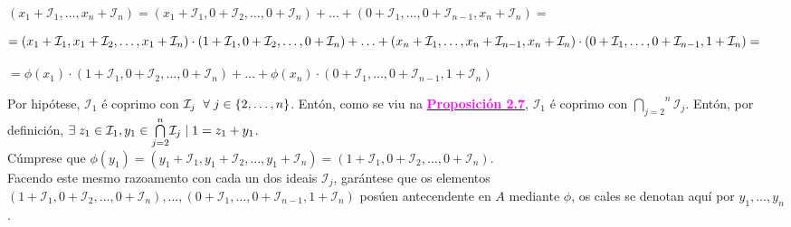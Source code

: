 \documentclass[twoside]{report}
\newcommand{\magbf}[1]{\textcolor{magenta}{\textbf{#1}}} %
\theoremstyle{mystyle}
\begin{document}
\begin{center}
$(x_{1} + \mathcal{I}_{1}, \ldots, x_{n} + \mathcal{I}_{n}) = (x_{1} + \mathcal{I}_{1}, 0 + \mathcal{I}_{2}, \ldots, 0 + \mathcal{I}_{n}) + \ldots + (0 + \mathcal{I}_{1}, \ldots, 0 + \mathcal{I}_{n-1}, x_{n} + \mathcal{I}_{n}) = $ 
\end{center}
$$\hspace{-7mm} = (x_{1} + \mathcal{I}_{1}, x_{1} + \mathcal{I}_{2}, \ldots, x_{1} + \mathcal{I}_{n}) \cdot (1 + \mathcal{I}_{1}, 0 + \mathcal{I}_{2}, \ldots, 0 + \mathcal{I}_{n}) + \ldots + (x_{n} + \mathcal{I}_{1}, \ldots, x_{n} + \mathcal{I}_{n-1}, x_{n} + \mathcal{I}_{n}) \cdot (0 + \mathcal{I}_{1}, \ldots, 0 + \mathcal{I}_{n-1}, 1 + \mathcal{I}_{n}) = $$
\begin{center}
$= \phi(x_{1}) \cdot (1 + \mathcal{I}_{1}, 0 + \mathcal{I}_{2}, \ldots, 0 + \mathcal{I}_{n}) + \ldots + \phi(x_{n}) \cdot (0 + \mathcal{I}_{1}, \ldots, 0 + \mathcal{I}_{n-1}, 1 + \mathcal{I}_{n})$\\
\end{center}

\noindent Por hipótese, $\mathcal{I}_{1}$ é coprimo con $\mathcal{I}_{j} \hspace{2mm} \forall \hspace{1mm} j \in \{2, \ldots, n\}$. Entón, como se viu na \hyperref[prop2.7]{\magbf{Proposición 2.7}}, $\mathcal{I}_{1}$ é coprimo con $\overset{n}{\underset{j = 2}{\bigcap}}\mathcal{I}_{j}$. Entón, por definición, $\exists \hspace{1mm} z_{1} \in \mathcal{I}_{1}, y_{1} \in \overset{n}{\underset{j = 2}{\bigcap}}\mathcal{I}_{j} \hspace{1mm} | \hspace{1mm} 1 = z_{1} + y_{1}$.\\

\noindent Cúmprese que $\phi(y_{1}) = (y_{1} + \mathcal{I}_{1}, y_{1} + \mathcal{I}_{2}, \ldots, y_{1} + \mathcal{I}_{n}) = (1 + \mathcal{I}_{1}, 0 + \mathcal{I}_{2}, \ldots, 0 + \mathcal{I}_{n})$.\\

\noindent Facendo este mesmo razoamento con cada un dos ideais $\mathcal{I}_{j}$, garántese que os elementos $(1 + \mathcal{I}_{1}, 0 + \mathcal{I}_{2}, \ldots, 0 + \mathcal{I}_{n}), \ldots, (0 + \mathcal{I}_{1}, \ldots, 0 + \mathcal{I}_{n-1}, 1 + \mathcal{I}_{n})$ posúen antecendente en $A$ mediante $\phi$, os cales se denotan aquí por $y_{1}, \ldots, y_{n}$. \\
\end{document}
